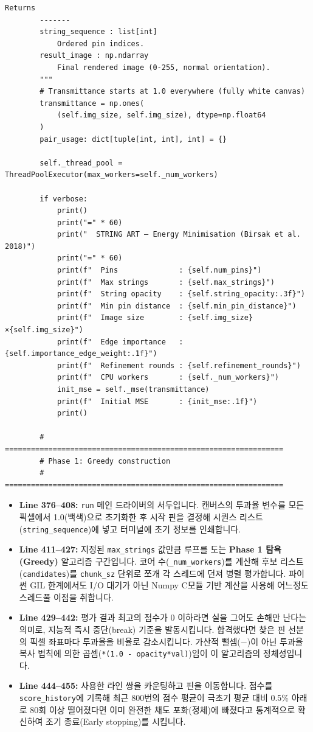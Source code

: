 \begin{lstlisting}[firstnumber=374]
        Returns
        -------
        string_sequence : list[int]
            Ordered pin indices.
        result_image : np.ndarray
            Final rendered image (0-255, normal orientation).
        """
        # Transmittance starts at 1.0 everywhere (fully white canvas)
        transmittance = np.ones(
            (self.img_size, self.img_size), dtype=np.float64
        )
        pair_usage: dict[tuple[int, int], int] = {}

        self._thread_pool = ThreadPoolExecutor(max_workers=self._num_workers)

        if verbose:
            print()
            print("=" * 60)
            print("  STRING ART – Energy Minimisation (Birsak et al. 2018)")
            print("=" * 60)
            print(f"  Pins              : {self.num_pins}")
            print(f"  Max strings       : {self.max_strings}")
            print(f"  String opacity    : {self.string_opacity:.3f}")
            print(f"  Min pin distance  : {self.min_pin_distance}")
            print(f"  Image size        : {self.img_size}×{self.img_size}")
            print(f"  Edge importance   : {self.importance_edge_weight:.1f}")
            print(f"  Refinement rounds : {self.refinement_rounds}")
            print(f"  CPU workers       : {self._num_workers}")
            init_mse = self._mse(transmittance)
            print(f"  Initial MSE       : {init_mse:.1f}")
            print()

        # ================================================================
        # Phase 1: Greedy construction
        # ================================================================
\end{lstlisting}
\begin{itemize}
\item \textbf{Line 376--408:} \texttt{run} 메인 드라이버의 서두입니다. 캔버스의 투과율 변수를 모든 픽셀에서 1.0(백색)으로 초기화한 후 시작 핀을 결정해 시퀀스 리스트(\texttt{string\_sequence})에 넣고 터미널에 초기 정보를 인쇄합니다.
\item \textbf{Line 411--427:} 지정된 \texttt{max\_strings} 값만큼 루프를 도는 \textbf{Phase 1 탐욕(Greedy)} 알고리즘 구간입니다. 코어 수(\texttt{\_num\_workers})를 계산해 후보 리스트(\texttt{candidates})를 \texttt{chunk\_sz} 단위로 쪼개 각 스레드에 던져 병렬 평가합니다. 파이썬 GIL 한계에서도 I/O 대기가 아닌 Numpy C모듈 기반 계산을 사용해 어느정도 스레드풀 이점을 취합니다.
\item \textbf{Line 429--442:} 평가 결과 최고의 점수가 0 이하라면 실을 그어도 손해만 난다는 의미로, 지능적 즉시 중단(break) 기준을 발동시킵니다. 합격했다면 찾은 핀 선분의 픽셀 좌표마다 투과율을 비율로 감소시킵니다. 가산적 뺄셈(\(-\))이 아닌 투과율 복사 법칙에 의한 곱셈(\texttt{*(1.0 - opacity*val)})임이 이 알고리즘의 정체성입니다.
\item \textbf{Line 444--455:} 사용한 라인 쌍을 카운팅하고 핀을 이동합니다. 점수를 \texttt{score\_history}에 기록해 최근 800번의 점수 평균이 극초기 평균 대비 0.5\% 아래로 80회 이상 떨어졌다면 이미 완전한 채도 포화(정체)에 빠졌다고 통계적으로 확신하여 조기 종료(Early stopping)를 시킵니다.
\end{itemize}

